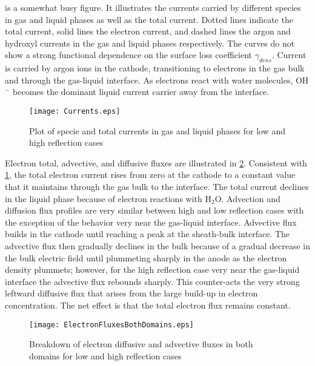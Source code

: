  is a somewhat busy figure. It illustrates the currents carried by different species in gas and liquid phases as well as the total current. Dotted lines indicate the total current, solid lines the electron current, and dashed lines the argon and hydroxyl currents in the gas and liquid phases respectively. The curves do not show a strong functional dependence on the surface loss coefficient $\gamma_{dens}$. Current is carried by argon ions in the cathode, transitioning to electrons in the gas bulk and through the gas-liquid interface. As electrons react with water molecules, OH$^-$ becomes the dominant liquid current carrier away from the interface.

\begin{figure}[htpb]
  \centering
  \texttt{[image: Currents.eps]}
  \caption{Plot of specie and total currents in gas and liquid phases for low and high reflection cases}
  \label{fig:currents}
\end{figure}

Electron total, advective, and diffusive fluxes are illustrated in \cref{fig:electron_fluxes}. Consistent with \cref{fig:currents}, the total electron current rises from zero at the cathode to a constant value that it maintains through the gas bulk to the interface. The total current declines in the liquid phase because of electron reactions with H$_2$O. Advection and diffusion flux profiles are very similar between high and low reflection cases with the exception of the behavior very near the gas-liquid interface. Advective flux builds in the cathode until reaching a peak at the sheath-bulk interface. The advective flux then gradually declines in the bulk because of a gradual decrease in the bulk electric field until plummeting sharply in the anode as the electron density plummets; however, for the high reflection case very near the gas-liquid interface the advective flux rebounds sharply. This counter-acts the very strong leftward diffusive flux that arises from the large build-up in electron concentration. The net effect is that the total electron flux remains constant.

\begin{figure}[htpb]
  \centering
  \texttt{[image: ElectronFluxesBothDomains.eps]}
  \caption{Breakdown of electron diffusive and advective fluxes in both domains for low and high reflection cases}
  \label{fig:electron_fluxes}
\end{figure}

